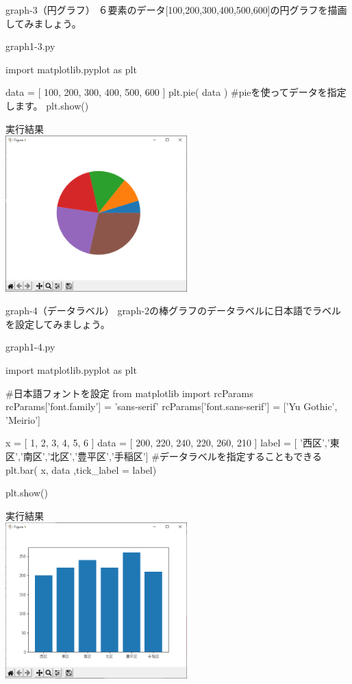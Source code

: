 \begin{pabox}{graph-3（円グラフ）}
６要素のデータ[100,200,300,400,500,600]の円グラフを描画してみましょう。
\begin{legbox}{graph1-3.py}
\begin{listing}{1}
import matplotlib.pyplot as plt

data = [ 100, 200, 300, 400, 500, 600 ]
plt.pie( data )
#pieを使ってデータを指定します。
plt.show()
\end{listing}


実行結果\\

\includegraphics[width=7cm]{images/graph3.png} 

\end{legbox}
\end{pabox}

\begin{pabox}{graph-4（データラベル）}
graph-2の棒グラフのデータラベルに日本語でラベルを設定してみましょう。
\begin{legbox}{graph1-4.py}
\begin{listing}{1}
import matplotlib.pyplot as plt

#日本語フォントを設定
from matplotlib import rcParams
rcParams['font.family'] = 'sans-serif'
rcParams['font.sans-serif'] = ['Yu Gothic', 'Meirio']

x = [ 1, 2, 3, 4, 5, 6 ]
data = [ 200, 220, 240, 220, 260, 210 ]
label = [ '西区','東区','南区','北区','豊平区','手稲区']
#データラベルを指定することもできる
plt.bar( x, data ,tick_label = label)

plt.show()
\end{listing}


実行結果\\

\includegraphics[width=7cm]{images/graph4.png} 

\end{legbox}
\end{pabox}


